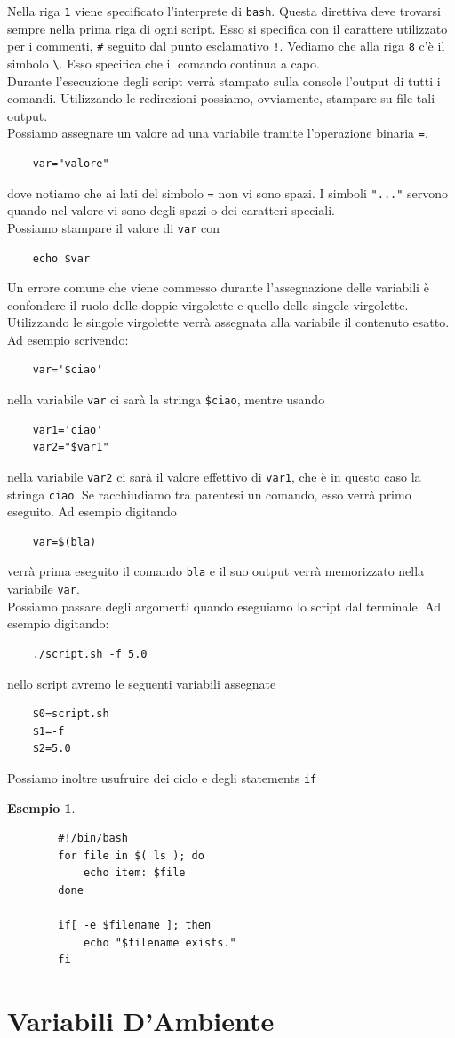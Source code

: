 \documentclass[11pt]{book}
\newtheorem{esempio}[section]{Esempio}
\begin{document}
Nella riga \verb*|1| viene specificato l'interprete di \verb*|bash|. Questa direttiva deve trovarsi sempre nella prima riga di ogni script. Esso si specifica con il carattere utilizzato per i commenti, \verb*|#| seguito dal punto esclamativo \verb*|!|. Vediamo che alla riga \verb*|8| c'è il simbolo \verb*|\|. Esso specifica che il comando continua a capo. \\
Durante l'esecuzione degli script verrà stampato sulla console l'output di tutti i comandi. Utilizzando le redirezioni possiamo, ovviamente, stampare su file tali output. \\
Possiamo assegnare un valore ad una variabile tramite l'operazione binaria \verb*|=|. 
\begin{verbatim}
	var="valore"
\end{verbatim}
dove notiamo che ai lati del simbolo \verb*|=| non vi sono spazi. I simboli \verb*|"..."| servono quando nel valore vi sono degli spazi o dei caratteri speciali. \\
Possiamo stampare il valore di \verb*|var| con
\begin{verbatim}
	echo $var
\end{verbatim}	
Un errore comune che viene commesso durante l'assegnazione delle variabili è confondere il ruolo delle doppie virgolette e quello delle singole virgolette.\\
Utilizzando le singole virgolette verrà assegnata alla variabile il contenuto esatto. Ad esempio scrivendo:
\begin{verbatim}
	var='$ciao'
\end{verbatim}
nella variabile \verb*|var| ci sarà la stringa \verb*|$ciao|, mentre usando
\begin{verbatim}
	var1='ciao'
	var2="$var1"
\end{verbatim}
nella variabile \verb*|var2| ci sarà il valore effettivo di \verb*|var1|, che è in questo caso la stringa \verb*|ciao|. Se racchiudiamo tra parentesi un comando, esso verrà primo eseguito. Ad esempio digitando
\begin{verbatim}
	var=$(bla)
\end{verbatim}
verrà prima eseguito il comando \verb*|bla| e il suo output verrà memorizzato nella variabile \verb*|var|.\\
Possiamo passare degli argomenti quando eseguiamo lo script dal terminale. Ad esempio digitando:
\begin{verbatim}
	./script.sh -f 5.0
\end{verbatim}
nello script avremo le seguenti variabili assegnate
\begin{verbatim}
	$0=script.sh
	$1=-f
	$2=5.0
\end{verbatim}
Possiamo inoltre usufruire dei ciclo e degli statements \verb*|if|
\begin{esempio}
	\begin{verbatim}
		#!/bin/bash
		for file in $( ls ); do
			echo item: $file
		done
		
		if[ -e $filename ]; then
			echo "$filename exists."
		fi
	\end{verbatim}
\end{esempio}



\chapter{Variabili D'Ambiente}
\end{document}
